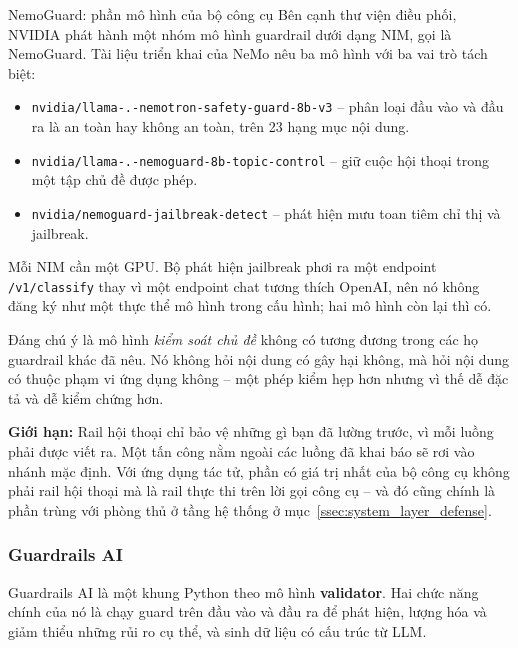 \begin{deepdive}{NemoGuard: phần mô hình của bộ công cụ}
Bên cạnh thư viện điều phối, NVIDIA phát hành một nhóm mô hình guardrail dưới dạng NIM, gọi là NemoGuard. Tài liệu triển khai của NeMo nêu ba mô hình với ba vai trò tách biệt:

\begin{itemize}
	\item \texttt{nvidia/\allowbreak llama-.-\allowbreak nemotron-\allowbreak safety-\allowbreak guard-\allowbreak 8b-\allowbreak v3} -- phân loại đầu vào và đầu ra là an toàn hay không an toàn, trên 23 hạng mục nội dung.
	\item \texttt{nvidia/\allowbreak llama-.-\allowbreak nemoguard-\allowbreak 8b-\allowbreak topic-\allowbreak control} -- giữ cuộc hội thoại trong một tập chủ đề được phép.
	\item \texttt{nvidia/\allowbreak nemoguard-\allowbreak jailbreak-\allowbreak detect} -- phát hiện mưu toan tiêm chỉ thị và jailbreak.
\end{itemize}

Mỗi NIM cần một GPU. Bộ phát hiện jailbreak phơi ra một endpoint \texttt{/v1/classify} thay vì một endpoint chat tương thích OpenAI, nên nó không đăng ký như một thực thể mô hình trong cấu hình; hai mô hình còn lại thì có.

Đáng chú ý là mô hình \emph{kiểm soát chủ đề} không có tương đương trong các họ guardrail khác đã nêu. Nó không hỏi nội dung có gây hại không, mà hỏi nội dung có thuộc phạm vi ứng dụng không -- một phép kiểm hẹp hơn nhưng vì thế dễ đặc tả và dễ kiểm chứng hơn.
\end{deepdive}

\textbf{Giới hạn:} Rail hội thoại chỉ bảo vệ những gì bạn đã lường trước, vì mỗi luồng phải được viết ra. Một tấn công nằm ngoài các luồng đã khai báo sẽ rơi vào nhánh mặc định. Với ứng dụng tác tử, phần có giá trị nhất của bộ công cụ không phải rail hội thoại mà là rail thực thi trên lời gọi công cụ -- và đó cũng chính là phần trùng với phòng thủ ở tầng hệ thống ở mục~\ref{ssec:system_layer_defense}.

\subsubsection{Guardrails AI}

Guardrails AI là một khung Python theo mô hình \textbf{validator}. Hai chức năng chính của nó là chạy guard trên đầu vào và đầu ra để phát hiện, lượng hóa và giảm thiểu những rủi ro cụ thể, và sinh dữ liệu có cấu trúc từ LLM.

